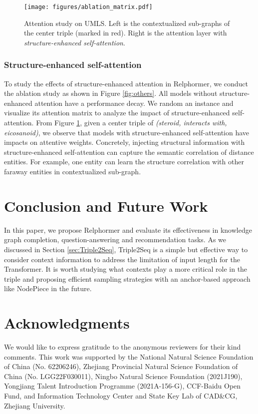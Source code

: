 \documentclass[sigconf]{acmart}
\begin{document}
\begin{figure}
    \centering
    \texttt{[image: figures/ablation\_matrix.pdf]}

    \caption{ 
    Attention study on UMLS.
Left is the contextualized sub-graphs of the center triple (marked in red).
    Right is the attention layer with \emph{structure-enhanced self-attention}.
    }
    \label{fig:matrix}
\end{figure}

\subsubsection{\textbf{Structure-enhanced self-attention}}
To study the effects of structure-enhanced attention in Relphormer, we conduct the ablation study as shown in Figure \ref{fig:others}.
All models without structure-enhanced attention have a performance decay. 
We random an instance and visualize its attention matrix to analyze the impact of structure-enhanced self-attention.
From Figure \ref{fig:matrix}, given a center triple of \textit{(steroid, interacts with, eicosanoid)}, we observe that models with structure-enhanced self-attention have impacts on attentive weights. 
Concretely, injecting structural information with structure-enhanced self-attention can capture the semantic correlation of distance entities.
For example, one entity can learn the structure correlation with other faraway entities in contextualized sub-graph.









\section{Conclusion and Future Work}
In this paper, we propose Relphormer and evaluate its effectiveness in knowledge graph completion, question-answering and recommendation tasks.
As we discussed in Section \ref{sec:Triple2Seq}, Triple2Seq is a simple but effective way to consider context information to address the limitation of input length for the Transformer. 
It is worth studying what contexts play a more critical role in the triple and proposing efficient sampling strategies with an anchor-based approach like NodePiece \cite{DBLP:conf/iclr/0001DWH22} in the future. 


\section{Acknowledgments}
We would like to express gratitude to the anonymous reviewers for their kind comments. 
This work was supported by the National Natural Science Foundation of China (No. 62206246), Zhejiang Provincial Natural Science Foundation of China (No. LGG22F030011), Ningbo Natural Science Foundation (2021J190), Yongjiang Talent Introduction Programme (2021A-156-G), CCF-Baidu Open Fund, and Information Technology Center and State Key Lab of CAD\&CG, Zhejiang University.
\end{document}
